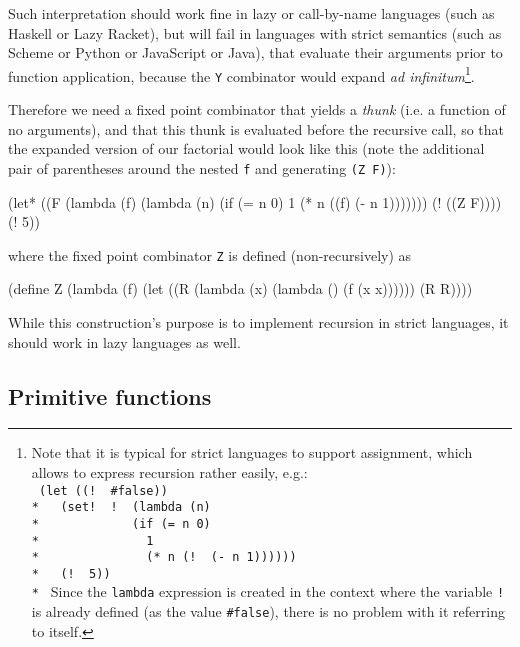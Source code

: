 Such interpretation should work fine in lazy or call-by-name languages
(such as Haskell or Lazy Racket), but will fail in languages with strict
semantics (such as Scheme or Python or JavaScript or Java), that evaluate
their arguments prior to function application, because the \texttt{Y}
combinator would expand \textit{ad infinitum}\footnote{
  Note that it is typical for strict languages to support assignment,
  which allows to express recursion rather easily, e.g.: \\
  \texttt{
    (let ((!\,\,\#false))\\*
    \-\ \ (set!\,\,!\,\,(lambda (n)\\*
    \-\ \ \ \ \ \ \ \ \ \ \ \ (if (= n 0)\\*
    \-\ \ \ \ \ \ \ \ \ \ \ \ \ \ 1\\*
    \-\ \ \ \ \ \ \ \ \ \ \ \ \ \ (* n (!\,\,(- n 1))))))\\*
    \-\ \ (!\,\,5)) \\*
  }
  Since the \texttt{lambda} expression is created in the context
  where the variable \texttt{!} is already defined (as the value
  \texttt{\#false}), there is no problem with it referring to itself.
}.

Therefore we need a fixed point combinator that yields a \textit{thunk}
(i.e. a function of no arguments), and that this thunk is evaluated
before the recursive call, so that the expanded version of our factorial
would look like this (note the additional pair of parentheses around
the nested \texttt{f} and generating \texttt{(Z F)}):

\begin{Snippet}
(let* ((F (lambda (f)
            (lambda (n)
              (if (= n 0)
                1
                (* n ((f) (- n 1)))))))
       (! ((Z F))))
  (! 5))
\end{Snippet}

where the fixed point combinator \texttt{Z} is defined (non-recursively) as

\begin{Snippet}
(define Z (lambda (f)
            (let ((R (lambda (x)
                       (lambda () (f (x x))))))
              (R R))))
\end{Snippet}

While this construction's purpose is to implement recursion in strict
languages, it should work in lazy languages as well.

\subsection{Primitive functions}

